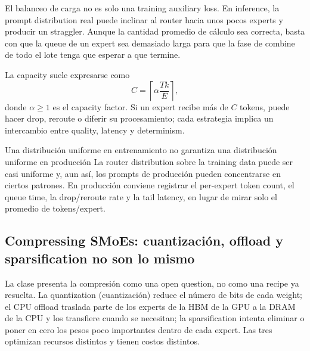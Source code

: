 El balanceo de carga no es solo una training auxiliary loss. En inference, la prompt distribution real puede inclinar al router hacia unos pocos experts y producir un straggler. Aunque la cantidad promedio de cálculo sea correcta, basta con que la queue de un expert sea demasiado larga para que la fase de combine de todo el lote tenga que esperar a que termine.


La capacity suele expresarse como
\[
C=\left\lceil \alpha\frac{Tk}{E}\right\rceil,
\]
donde $\alpha\ge 1$ es el capacity factor. Si un expert recibe más de $C$ tokens, puede hacer drop, reroute o diferir su procesamiento; cada estrategia implica un intercambio entre quality, latency y determinism.

\begin{warningbox}{Una distribución uniforme en entrenamiento no garantiza una distribución uniforme en producción}
La router distribution sobre la training data puede ser casi uniforme y, aun así, los prompts de producción pueden concentrarse en ciertos patrones. En producción conviene registrar el per-expert token count, el queue time, la drop/reroute rate y la tail latency, en lugar de mirar solo el promedio de tokens/expert.
\end{warningbox}


\subsection{Compressing SMoEs: cuantización, offload y sparsification no son lo mismo}

La clase presenta la compresión como una open question, no como una recipe ya resuelta. La quantization (cuantización) reduce el número de bits de cada weight; el CPU offload traslada parte de los experts de la HBM de la GPU a la DRAM de la CPU y los transfiere cuando se necesitan; la sparsification intenta eliminar o poner en cero los pesos poco importantes dentro de cada expert. Las tres optimizan recursos distintos y tienen costos distintos.


